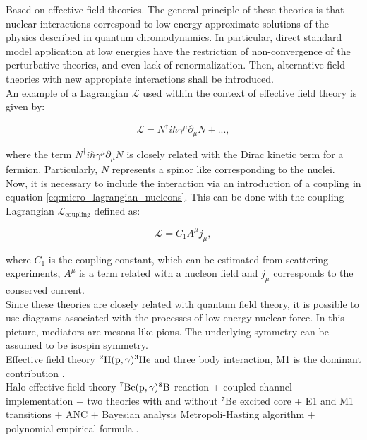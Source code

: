 \documentclass[openany]{book}
\begin{document}
Based on effective field theories. The general principle of these theories is that nuclear interactions correspond to low-energy approximate solutions of the physics described in quantum chromodynamics. In particular, direct standard model application at low energies have the restriction of non-convergence of the perturbative theories, and even lack of renormalization. Then, alternative field theories with new appropiate interactions shall be introduced. \\

An example of a Lagrangian $\mathcal{L}$ used within the context of effective field theory is given by: 

\begin{equation} \label{eq:micro_lagrangian_nucleons}
	\mathcal{L} = N^{\dagger}i\hbar\gamma^\mu\partial_\mu N + ... ,
\end{equation}

where the term $ N^{\dagger}i\hbar\gamma^\mu\partial_\mu N$ is closely related with the Dirac kinetic term for a fermion. Particularly, $N$ represents a spinor like corresponding to the nuclei. \\

Now, it is necessary to include the interaction via an introduction of a coupling in equation \ref{eq:micro_lagrangian_nucleons}. This can be done with the coupling Lagrangian  $	\mathcal{L}_{\mathrm{coupling}} $ defined as: 

 \begin{equation} \label{eq:micro_lagrangian_coupling}
 	\mathcal{L} =  C_1 A^\mu j_\mu ,
 \end{equation}

where $C_1$ is the coupling constant, which can be estimated from scattering experiments, $A^\mu $ is a term related with a nucleon field and $j_\mu$ corresponds to the conserved current.  \\

Since these theories are closely related with quantum field theory, it is possible to use diagrams associated with the processes of low-energy nuclear force. In this picture, mediators are mesons like pions. The underlying symmetry can be assumed to be isospin symmetry.  \\

Effective field theory $\mathrm{{}^{2}H(p, \gamma){}^{3}He}$ and three body interaction, M1 is the dominant contribution \cite{sadeghi_khalili_godarzi_2013}. \\

 Halo effective field theory $\mathrm{{}^{7}Be(p, \gamma){}^{8}B}$ reaction + coupled channel implementation + two theories with and without $\mathrm{{}^{7}Be}$ excited core  + E1 and M1 transitions + ANC + Bayesian analysis Metropoli-Hasting algorithm + polynomial empirical formula  \cite{higa_premarathna_rupak_2022}.
\end{document}
